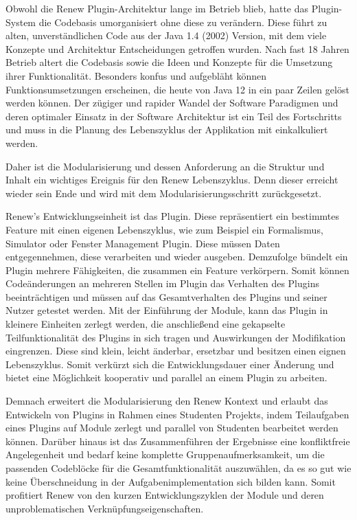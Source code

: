 Obwohl die Renew Plugin-Architektur lange im Betrieb blieb, hatte das Plugin-System die Codebasis umorganisiert ohne diese zu verändern. Diese führt zu alten, unverständlichen Code aus der Java 1.4 (2002) Version, mit dem viele Konzepte und Architektur Entscheidungen getroffen wurden. Nach fast 18 Jahren Betrieb altert die Codebasis sowie die Ideen und Konzepte für die Umsetzung ihrer Funktionalität. Besonders konfus und aufgebläht können Funktionsumsetzungen erscheinen, die heute von Java 12 in ein paar Zeilen gelöst werden können. Der zügiger und rapider Wandel der Software Paradigmen und deren optimaler Einsatz in der Software Architektur ist ein Teil des Fortschritts und muss in die Planung des Lebenszyklus der Applikation mit einkalkuliert werden. \newline

Daher ist die Modularisierung und dessen Anforderung an die Struktur und Inhalt ein wichtiges Ereignis für den Renew Lebenszyklus. Denn dieser erreicht wieder sein Ende und wird mit dem Modularisierungsschritt zurückgesetzt. \bigbreak

Renew's Entwicklungseinheit ist das Plugin. Diese repräsentiert ein bestimmtes Feature mit einen eigenen Lebenszyklus, wie zum Beispiel ein Formalismus, Simulator oder Fenster Management Plugin. Diese müssen Daten entgegennehmen, diese verarbeiten und wieder ausgeben. Demzufolge bündelt ein Plugin mehrere Fähigkeiten, die zusammen ein Feature verkörpern. Somit können Codeänderungen an mehreren Stellen im Plugin das Verhalten des Plugins beeinträchtigen und müssen auf das Gesamtverhalten des Plugins und seiner Nutzer getestet werden. Mit der Einführung der Module, kann das Plugin in kleinere Einheiten zerlegt werden, die anschließend eine gekapselte Teilfunktionalität des Plugins in sich tragen und Auswirkungen der Modifikation eingrenzen. Diese sind klein, leicht änderbar, ersetzbar und besitzen einen eignen Lebenszyklus. Somit verkürzt sich die Entwicklungsdauer einer Änderung und bietet eine Möglichkeit kooperativ und parallel an einem Plugin zu arbeiten. \newline

Demnach erweitert die Modularisierung den Renew Kontext und erlaubt das Entwickeln von Plugins in Rahmen eines Studenten Projekts, indem Teilaufgaben eines Plugins auf Module zerlegt und parallel von Studenten bearbeitet werden können. Darüber hinaus ist das Zusammenführen der Ergebnisse eine konfliktfreie Angelegenheit und bedarf keine komplette Gruppenaufmerksamkeit, um die passenden Codeblöcke für die Gesamtfunktionalität auszuwählen, da es so gut wie keine Überschneidung in der Aufgabenimplementation sich bilden kann. Somit profitiert Renew von den kurzen Entwicklungszyklen der Module und deren unproblematischen Verknüpfungseigenschaften. 

